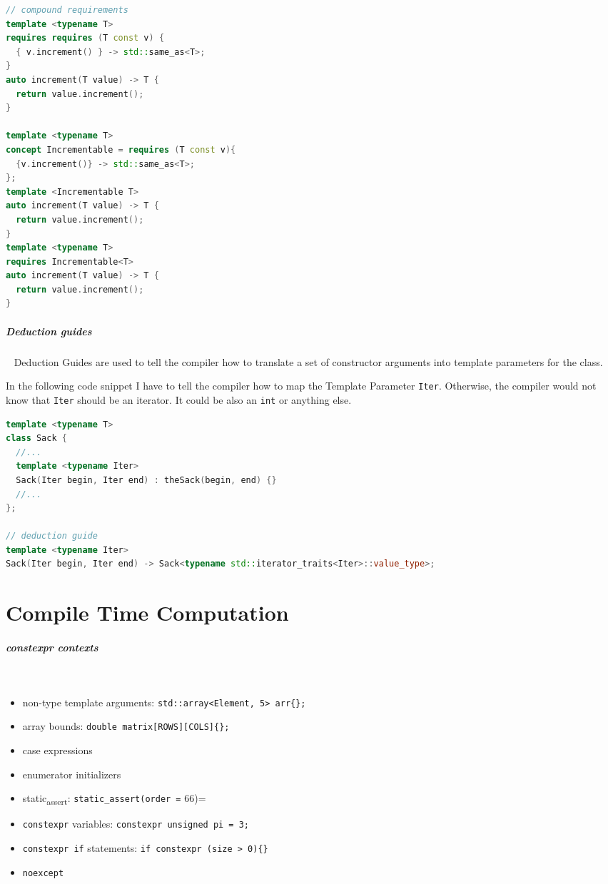 \documentclass[11pt,twoside,landscape]{article}
\begin{document}
\begin{multicols}{2}
\begin{lstlisting}[language=c++,label=lst:orga17ab5f,caption={Compound requirements exmaple},captionpos=b,numbers=none]
// compound requirements
template <typename T>
requires requires (T const v) {
  { v.increment() } -> std::same_as<T>;
}
auto increment(T value) -> T {
  return value.increment();
}

template <typename T>
concept Incrementable = requires (T const v){
  {v.increment()} -> std::same_as<T>;
};
template <Incrementable T>
auto increment(T value) -> T {
  return value.increment();
}
template <typename T>
requires Incrementable<T>
auto increment(T value) -> T {
  return value.increment();
}
\end{lstlisting}

\subparagraph{Deduction guides} \
\label{sec:org9bdfe63}
Deduction Guides are used to tell the compiler how to translate a set of constructor arguments into template parameters for the class.

In the following code snippet I have to tell the compiler how to map the Template Parameter \texttt{Iter}.
Otherwise, the compiler would not know that \texttt{Iter} should be an iterator.
It could be also an \texttt{int} or anything else.


\begin{lstlisting}[language=c++,numbers=none]
template <typename T>
class Sack {
  //...
  template <typename Iter>
  Sack(Iter begin, Iter end) : theSack(begin, end) {}
  //...
};

// deduction guide
template <typename Iter>
Sack(Iter begin, Iter end) -> Sack<typename std::iterator_traits<Iter>::value_type>;
\end{lstlisting}

\section{Compile Time Computation}
\label{sec:orgb59a2a5}
\subparagraph{constexpr contexts} \
\label{sec:orgfe7cfbd}
\begin{itemize}
\item non-type template arguments: \texttt{std::array<Element, 5> arr\{\};}
\item array bounds: \texttt{double matrix[ROWS][COLS]\{\};}
\item case expressions
\item enumerator initializers
\item static\textsubscript{assert}: \texttt{static\_assert(order =} 66)=
\item \texttt{constexpr} variables: \texttt{constexpr unsigned pi = 3;}
\item \texttt{constexpr if} statements: \texttt{if constexpr (size > 0)\{\}}
\item \texttt{noexcept}
\end{itemize}


\end{multicols}
\end{document}
